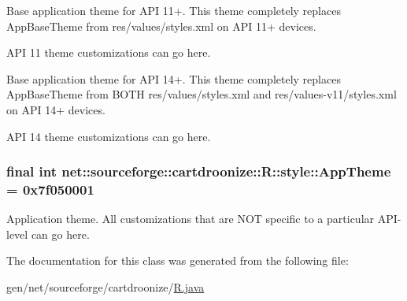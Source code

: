 Base application theme for API 11+. This theme completely replaces AppBaseTheme from res/values/styles.xml on API 11+ devices.

API 11 theme customizations can go here.

Base application theme for API 14+. This theme completely replaces AppBaseTheme from BOTH res/values/styles.xml and res/values-\/v11/styles.xml on API 14+ devices.

API 14 theme customizations can go here. \hypertarget{classnet_1_1sourceforge_1_1cartdroonize_1_1R_1_1style_a4e167c21d623225c442c6a2bcd06a82c}{
\subsubsection[{AppTheme}]{\setlength{\rightskip}{0pt plus 5cm}final int {\bf net::sourceforge::cartdroonize::R::style::AppTheme} = 0x7f050001}}
\label{classnet_1_1sourceforge_1_1cartdroonize_1_1R_1_1style_a4e167c21d623225c442c6a2bcd06a82c}
Application theme. All customizations that are NOT specific to a particular API-\/level can go here. 

The documentation for this class was generated from the following file:\begin{DoxyCompactItemize}
\item 
gen/net/sourceforge/cartdroonize/\hyperlink{R_8java}{R.java}\end{DoxyCompactItemize}
